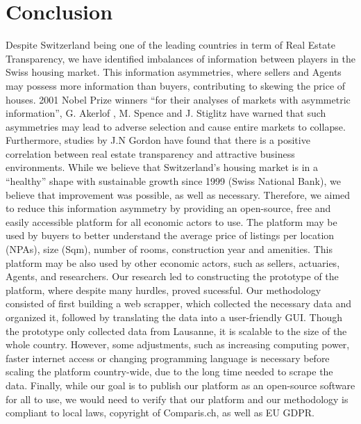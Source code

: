 \documentclass[main]{subfiles}
\begin{document}
\section{Conclusion}
Despite Switzerland being one of the leading countries in term of Real Estate Transparency, we have identified imbalances of information between players in the Swiss housing market. This information asymmetries, where sellers and Agents may possess more information than buyers, contributing to skewing the price of houses. 
2001 Nobel Prize winners “for their analyses of markets with asymmetric information”, G. Akerlof 
\cite{akerlofMarketLemonsQuality1970}, 
M. Spence \cite{spenceInformationalAspectsMarket1976} and 
J. Stiglitz \cite{stiglitzAsymmetricInformationCredit1992} 
have warned that such asymmetries may lead to adverse selection and cause entire markets to collapse. Furthermore, studies by J.N Gordon have found that there is a positive correlation between real estate transparency and attractive business environments. While we believe that Switzerland's housing market is in a “healthy” shape with sustainable growth since 1999 (Swiss National Bank), we believe that improvement was possible, as well as necessary.
Therefore, we aimed to reduce this information asymmetry by providing an open-source, free and easily accessible platform for all economic actors to use. The platform may be used by buyers to better understand the average price of listings per location (NPAs), size (Sqm), number of rooms, construction year and amenities. This platform may be also used by other economic actors, such as sellers, actuaries, Agents, and researchers.
Our research led to constructing the prototype of the platform, where despite many hurdles, proved sucessful. Our methodology consisted of first building a web scrapper, which collected the necessary data and organized it, followed by translating the data into a user-friendly GUI. Though the prototype only collected data from Lausanne, it is scalable to the size of the whole country. However, some adjustments, such as increasing computing power, faster internet access or changing programming language is necessary before scaling the platform country-wide, due to the long time needed to scrape the data. 
Finally, while our goal is to publish our platform as an open-source software for all to use, we would need to verify that our platform and our methodology is compliant to local laws, copyright of Comparis.ch, as well as EU GDPR.
\end{document}
